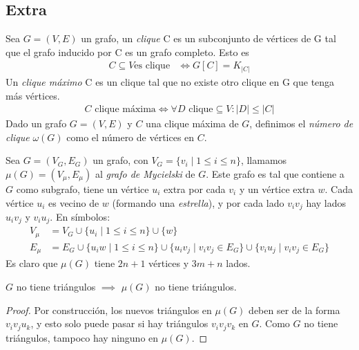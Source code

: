 \subsection{Extra}

\begin{definition}
Sea $G = (V,E)$ un grafo, un \emph{clique} C es un subconjunto de vértices de G tal que el grafo inducido por C es un grafo
completo. Esto es 
\begin{align}
    C \subseteq V \text{es clique} &\iff G[C] = K_{|C|}
\end{align}
Un \emph{clique máximo} C es un clique tal que no existe otro clique en G que tenga más vértices. \begin{align}
    C \text{ clique máxima} \iff \forall D \text{ clique} \subseteq V \colon |D| \le |C|
\end{align}
Dado un grafo $G = (V,E)$ y $C$ una clique máxima de $G$, definimos el \emph{número de clique} $\omega(G)$ como el número de vértices en $C$.
\end{definition}

\begin{definition}
Sea $G = (V_G, E_G)$ un grafo, con $V_G = \{v_i \mid 1 \le i \le n\}$, llamamos $\mu(G) = (V_\mu, E_\mu)$ al \emph{grafo de Mycielski} de $G$. Este grafo es tal que contiene a $G$ como subgrafo, tiene un vértice $u_i$ extra por cada $v_i$ y un vértice extra $w$. Cada vértice $u_i$ es vecino de $w$ (formando una \emph{estrella}), y por cada lado $v_iv_j$ hay lados $u_iv_j$ y $v_iu_j$.
En símbolos:
\begin{align}
V_\mu &= V_G \cup \{u_i \mid 1 \le i \le n \} \cup \{w\}\\
E_\mu &= E_G \cup \{ u_i w \mid 1 \le i \le n\} \cup \{u_i v_j \mid v_i v_j \in E_G \} \cup \{v_i u_j \mid v_i v_j \in E_G \}
\end{align}
Es claro que $\mu(G)$ tiene $2n+1$ vértices y $3m+n$ lados.
\end{definition}
\begin{proposition}\label{Mycielski_triangle_free}
$G$ no tiene triángulos $\implies$ $\mu(G)$ no tiene triángulos.
\end{proposition}
\begin{proof}
Por construcción, los nuevos triángulos en $\mu(G)$ deben ser de la forma $v_i v_j u_k$, y esto solo puede pasar si hay triángulos $v_i v_j v_k$ en $G$. Como $G$ no tiene triángulos, tampoco hay ninguno en $\mu(G)$.
\end{proof}

